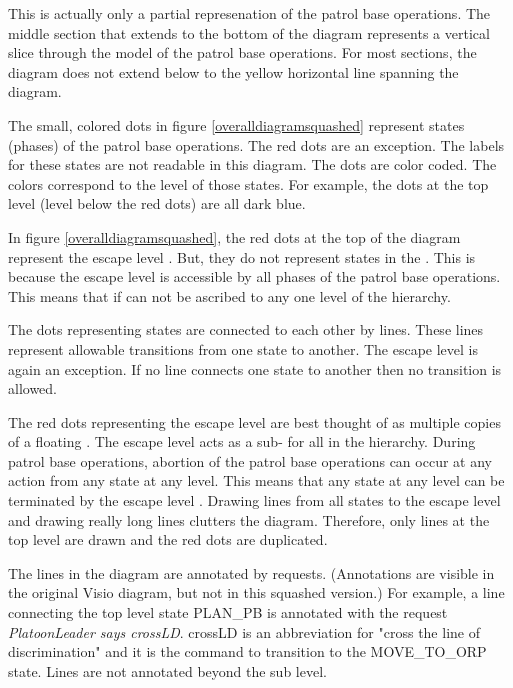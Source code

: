 \documentclass[../../main/main.tex]{subfiles}
\begin{document}
This is actually only a partial represenation of the patrol base operations.  The middle section that extends to the bottom of the diagram represents a vertical slice through the model of the patrol base operations.  For most sections, the diagram does not extend below to the yellow horizontal line spanning the diagram.  


The small, colored dots in figure \ref{overalldiagramsquashed} represent states (phases) of the patrol base operations.  The red dots are an exception.  The labels for these states are not readable in this diagram.  The dots are color coded.  The colors correspond to the level of those states.  For example, the dots at the top level (level below the red dots) are all dark blue.  

In figure \ref{overalldiagramsquashed}, the red dots at the top of the diagram represent the escape level .  But, they do not represent states in the .  This is because the escape level   is accessible by all phases of the patrol base operations.  This means that if can not be ascribed to any one level of the hierarchy. 


The dots representing states are connected to each other by lines.  These lines represent allowable transitions from one state to another.  The escape level is again an exception.  If no line connects one state to another then no transition is allowed.  

The red dots representing the escape level  are best thought of as multiple copies of a floating .  The escape level  acts as a sub- for all  in the hierarchy.  During patrol base operations, abortion of the patrol base operations can occur at any action from any state at any level.  This means that any state at any level can be terminated by the escape level .  Drawing lines from all states to the escape level  and drawing really long lines clutters the diagram.  Therefore, only lines at the top level are drawn and the red dots are duplicated.

 The lines in the diagram are annotated by  requests.  (Annotations are visible in the original Visio diagram, but not in this squashed version.)  For example, a line connecting the top level state PLAN_PB is annotated with the request \textit{PlatoonLeader says crossLD}.  crossLD is an abbreviation for "cross the line of discrimination" and it is the command to transition to the MOVE_TO_ORP state.    Lines are not annotated beyond the sub level.
\end{document}
